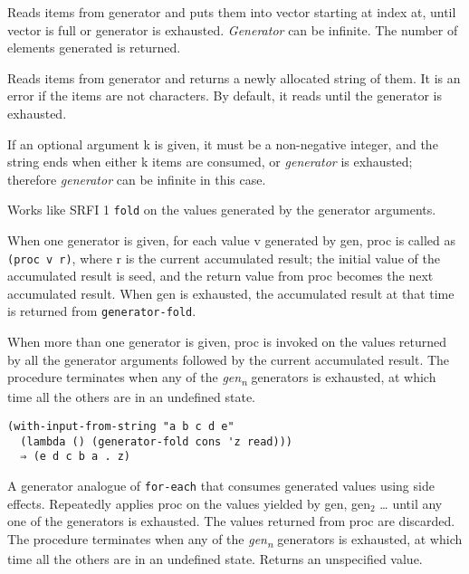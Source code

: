 \begin{entry}{%
  }

Reads items from generator and puts them into vector starting at index
at, until vector is full or generator is exhausted. \emph{Generator} can
be infinite. The number of elements generated is returned.
\end{entry}

\begin{entry}{%
  }

Reads items from generator and returns a newly allocated string of them.
It is an error if the items are not characters. By default, it reads
until the generator is exhausted.

If an optional argument k is given, it must be a non-negative integer,
and the string ends when either k items are consumed, or
\emph{generator} is exhausted; therefore \emph{generator} can be
infinite in this case.
\end{entry}

\begin{entry}{%
  }

Works like SRFI 1 \texttt{fold} on the values generated by the generator
arguments.

When one generator is given, for each value v generated by gen, proc is
called as \texttt{(proc\ v\ r)}, where r is the current accumulated
result; the initial value of the accumulated result is seed, and the
return value from proc becomes the next accumulated result. When gen is
exhausted, the accumulated result at that time is returned from
\texttt{generator-fold}.

When more than one generator is given, proc is invoked on the values
returned by all the generator arguments followed by the current
accumulated result. The procedure terminates when any of the
\emph{gen\textsubscript{n}} generators is exhausted, at which time all
the others are in an undefined state.

\begin{verbatim}
(with-input-from-string "a b c d e"
  (lambda () (generator-fold cons 'z read)))
  ⇒ (e d c b a . z)
\end{verbatim}
\end{entry}

\begin{entry}{%
  }

A generator analogue of \texttt{for-each} that consumes generated values
using side effects. Repeatedly applies proc on the values yielded by
gen, gen$_2$ \ldots{} until any one of the generators is
exhausted. The values returned from proc are discarded. The procedure
terminates when any of the \emph{gen\textsubscript{n}} generators is
exhausted, at which time all the others are in an undefined state.
Returns an unspecified value.
\end{entry}

